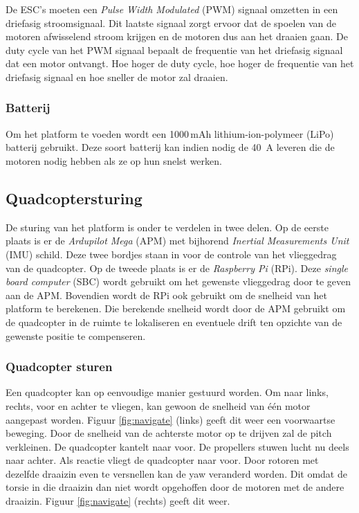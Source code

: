 \npar De ESC's moeten een \textit{Pulse Width Modulated} (PWM) signaal omzetten in een driefasig stroomsignaal. Dit laatste signaal zorgt ervoor dat de spoelen van de motoren afwisselend stroom krijgen en de motoren dus aan het draaien gaan. De duty cycle van het PWM signaal bepaalt de frequentie van het driefasig signaal dat een motor ontvangt. Hoe hoger de duty cycle, hoe hoger de frequentie van het driefasig signaal en hoe sneller de motor zal draaien.

\subsubsection{Batterij}
Om het platform te voeden wordt een 1000\,mAh lithium-ion-polymeer (LiPo) batterij gebruikt. Deze soort batterij kan indien nodig de \SI{40}{A} leveren die de motoren nodig hebben als ze op hun snelst werken.

\subsection{Quadcoptersturing} \label{sec:quadcoptersturing}
De sturing van het platform is onder te verdelen in twee delen. Op de eerste plaats is er de \textit{Ardupilot Mega} (APM) met bijhorend \textit{Inertial Measurements Unit} (IMU) schild. Deze twee bordjes staan in voor de controle van het vlieggedrag van de quadcopter. Op de tweede plaats is er de \textit{Raspberry Pi} (RPi). Deze \textit{single board computer} (SBC) wordt gebruikt om het gewenste vlieggedrag door te geven aan de APM. Bovendien wordt de RPi ook gebruikt om de snelheid van het platform te berekenen. Die berekende snelheid wordt door de APM gebruikt om de quadcopter in de ruimte te lokaliseren en eventuele drift ten opzichte van de gewenste positie te compenseren.

\subsubsection{Quadcopter sturen}
Een quadcopter kan op eenvoudige manier gestuurd worden. Om naar links, rechts, voor en achter te vliegen, kan gewoon de snelheid van \'e\'en motor aangepast worden. Figuur \ref{fig:navigate} (links) geeft dit weer een voorwaartse beweging. Door de snelheid van de achterste motor op te drijven zal de pitch verkleinen. De quadcopter kantelt naar voor. De propellers stuwen lucht nu deels naar achter. Als reactie vliegt de quadcopter naar voor. Door rotoren met dezelfde draaizin even te versnellen kan de yaw veranderd worden. Dit omdat de torsie in die draaizin dan niet wordt opgehoffen door de motoren met de andere draaizin. Figuur \ref{fig:navigate} (rechts) geeft dit weer.

